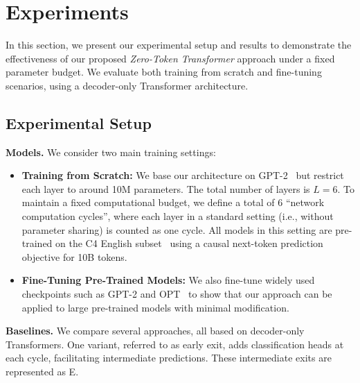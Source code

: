 \section{Experiments}
\label{sec:experiments}
In this section, we present our experimental setup and results to demonstrate the effectiveness of our proposed \textit{Zero-Token Transformer} approach under a fixed parameter budget. We evaluate both {training from scratch} and {fine-tuning} scenarios, using a decoder-only Transformer architecture.

\subsection{Experimental Setup}
\label{sec:exp_setup}

\textbf{Models.}
We consider two main training settings:
\begin{itemize}[leftmargin=*]
    \item \textbf{Training from Scratch:} We base our architecture on GPT-2~\cite{radford2019language} but restrict each layer to around 10M parameters. The total number of layers is $L=6$. To maintain a fixed computational budget, we define a total of 6 ``network computation cycles'',  where each layer in a standard setting (i.e., without parameter sharing) is counted as one cycle. All models in this setting are pre-trained on the C4 English subset~\cite{raffel2020exploring} using a causal next-token prediction objective for 10B tokens.
    \item \textbf{Fine-Tuning Pre-Trained Models:} We also fine-tune widely used checkpoints such as {GPT-2} and {OPT}~\cite{zhang2023opt} to show that our approach can be applied to large pre-trained models with minimal modification.
\end{itemize}

\textbf{Baselines.}
We compare several approaches, all based on decoder-only Transformers. One variant, referred to as early exit, adds classification heads at each cycle, facilitating intermediate predictions. These intermediate exits are represented as E.

